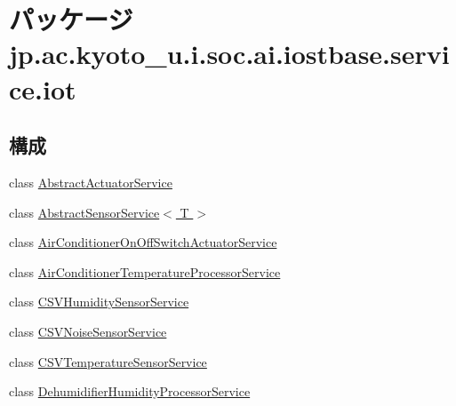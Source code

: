 \hypertarget{namespacejp_1_1ac_1_1kyoto__u_1_1i_1_1soc_1_1ai_1_1iostbase_1_1service_1_1iot}{\section{パッケージ jp.\-ac.\-kyoto\-\_\-u.\-i.\-soc.\-ai.\-iostbase.\-service.\-iot}
\label{namespacejp_1_1ac_1_1kyoto__u_1_1i_1_1soc_1_1ai_1_1iostbase_1_1service_1_1iot}
}
\subsection*{構成}
\begin{DoxyCompactItemize}
\item 
class \hyperlink{classjp_1_1ac_1_1kyoto__u_1_1i_1_1soc_1_1ai_1_1iostbase_1_1service_1_1iot_1_1_abstract_actuator_service}{Abstract\-Actuator\-Service}
\item 
class \hyperlink{classjp_1_1ac_1_1kyoto__u_1_1i_1_1soc_1_1ai_1_1iostbase_1_1service_1_1iot_1_1_abstract_sensor_service_3_01_t_01_4}{Abstract\-Sensor\-Service$<$ T $>$}
\item 
class \hyperlink{classjp_1_1ac_1_1kyoto__u_1_1i_1_1soc_1_1ai_1_1iostbase_1_1service_1_1iot_1_1_air_conditioner_on_off_switch_actuator_service}{Air\-Conditioner\-On\-Off\-Switch\-Actuator\-Service}
\item 
class \hyperlink{classjp_1_1ac_1_1kyoto__u_1_1i_1_1soc_1_1ai_1_1iostbase_1_1service_1_1iot_1_1_air_conditioner_temperature_processor_service}{Air\-Conditioner\-Temperature\-Processor\-Service}
\item 
class \hyperlink{classjp_1_1ac_1_1kyoto__u_1_1i_1_1soc_1_1ai_1_1iostbase_1_1service_1_1iot_1_1_c_s_v_humidity_sensor_service}{C\-S\-V\-Humidity\-Sensor\-Service}
\item 
class \hyperlink{classjp_1_1ac_1_1kyoto__u_1_1i_1_1soc_1_1ai_1_1iostbase_1_1service_1_1iot_1_1_c_s_v_noise_sensor_service}{C\-S\-V\-Noise\-Sensor\-Service}
\item 
class \hyperlink{classjp_1_1ac_1_1kyoto__u_1_1i_1_1soc_1_1ai_1_1iostbase_1_1service_1_1iot_1_1_c_s_v_temperature_sensor_service}{C\-S\-V\-Temperature\-Sensor\-Service}
\item 
class \hyperlink{classjp_1_1ac_1_1kyoto__u_1_1i_1_1soc_1_1ai_1_1iostbase_1_1service_1_1iot_1_1_dehumidifier_humidity_processor_service}{Dehumidifier\-Humidity\-Processor\-Service}
\item 

\end{DoxyCompactItemize}
